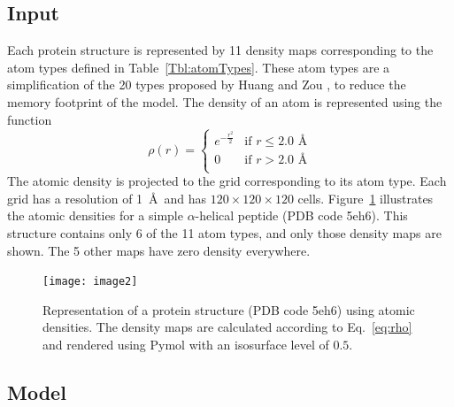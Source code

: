 \documentclass{bioinfo}
\begin{document}
\subsection{Input}

Each protein structure is represented by 11 density maps corresponding
to the atom types defined in Table~\ref{Tbl:atomTypes}. These atom
types are a simplification of the 20 types proposed by Huang and
Zou \citep{huang2006iterative, huang2008iterative}, to reduce the
memory footprint of the model.
The density of an atom is represented using the function
\begin{equation}
\rho(r) =  \begin{cases}
               e^{-\frac{r^2}{2}}&\text{if } r\leq 2.0\text{ \AA} \\
               0                 &\text{if } r>2.0\text{ \AA} \\
            \end{cases}
\label{eq:rho}
\end{equation}
The atomic density is projected to the grid corresponding to its atom
type. Each grid has a resolution of 1~\AA\ and has $120\times
120\times 120$ cells.
%
Figure~\ref{Fig:atomic_densities} illustrates the atomic densities for
a simple $\alpha$-helical peptide (PDB code 5eh6). This structure
contains only 6 of the 11 atom types, and only those density maps are
shown. The 5 other maps have zero density everywhere.

\begin{figure}[t]
    \centerline{\texttt{[image: image2]}}
%
    \caption{Representation of a protein structure (PDB code 5eh6)
    using atomic densities. The density maps are calculated according
    to Eq.~\ref{eq:rho} and rendered using Pymol \citep{PyMOL} with an
    isosurface level of $0.5$.}
%
    \label{Fig:atomic_densities}
\end{figure}


\subsection{Model}
\end{document}
